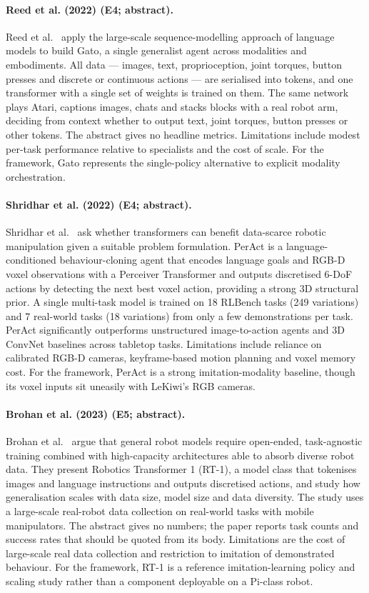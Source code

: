 \documentclass[10pt,a4paper]{article}
\begin{document}
\paragraph{Reed et al. (2022) (E4; abstract).} Reed et al.~\cite{Reed2022} apply the large-scale sequence-modelling approach of language models to build Gato, a single generalist agent across modalities and embodiments. All data --- images, text, proprioception, joint torques, button presses and discrete or continuous actions --- are serialised into tokens, and one transformer with a single set of weights is trained on them. The same network plays Atari, captions images, chats and stacks blocks with a real robot arm, deciding from context whether to output text, joint torques, button presses or other tokens. The abstract gives no headline metrics. Limitations include modest per-task performance relative to specialists and the cost of scale. For the framework, Gato represents the single-policy alternative to explicit modality orchestration.

\paragraph{Shridhar et al. (2022) (E4; abstract).} Shridhar et al.~\cite{Shridhar2022} ask whether transformers can benefit data-scarce robotic manipulation given a suitable problem formulation. PerAct is a language-conditioned behaviour-cloning agent that encodes language goals and RGB-D voxel observations with a Perceiver Transformer and outputs discretised 6-DoF actions by detecting the next best voxel action, providing a strong 3D structural prior. A single multi-task model is trained on 18 RLBench tasks (249 variations) and 7 real-world tasks (18 variations) from only a few demonstrations per task. PerAct significantly outperforms unstructured image-to-action agents and 3D ConvNet baselines across tabletop tasks. Limitations include reliance on calibrated RGB-D cameras, keyframe-based motion planning and voxel memory cost. For the framework, PerAct is a strong imitation-modality baseline, though its voxel inputs sit uneasily with LeKiwi's RGB cameras.

\paragraph{Brohan et al. (2023) (E5; abstract).} Brohan et al.~\cite{Brohan2023a} argue that general robot models require open-ended, task-agnostic training combined with high-capacity architectures able to absorb diverse robot data. They present Robotics Transformer 1 (RT-1), a model class that tokenises images and language instructions and outputs discretised actions, and study how generalisation scales with data size, model size and data diversity. The study uses a large-scale real-robot data collection on real-world tasks with mobile manipulators. The abstract gives no numbers; the paper reports task counts and success rates that should be quoted from its body. Limitations are the cost of large-scale real data collection and restriction to imitation of demonstrated behaviour. For the framework, RT-1 is a reference imitation-learning policy and scaling study rather than a component deployable on a Pi-class robot.
\end{document}
